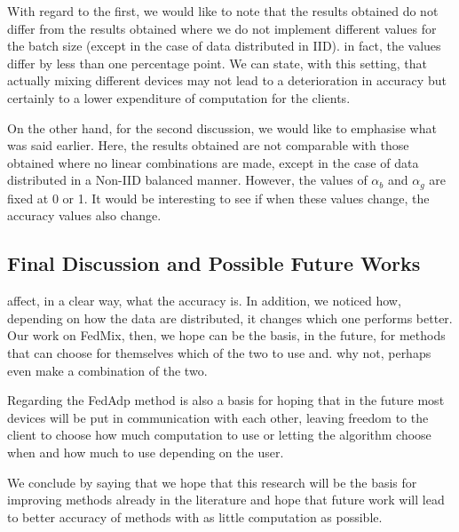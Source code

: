 \documentclass[conference]{IEEEtran}
\begin{document}
With regard to the first, we would like to note that the results obtained do not differ from the results obtained where we do not implement different values for the batch size (except in the case of data distributed in IID). in fact, the values differ by less than one percentage point. We can state, with this setting, that actually mixing different devices may not lead to a deterioration in accuracy but certainly to a lower expenditure of computation for the clients.

On the other hand, for the second discussion, we would like to emphasise what was said earlier. Here, the results obtained are not comparable with those obtained where no linear combinations are made, except in the case of data distributed in a Non-IID balanced manner. However, the values of $\alpha_b$ and $\alpha_g$ are fixed at 0 or 1. It would be interesting to see if when these values change, the accuracy values also change.

\subsection{Final Discussion and Possible Future Works}
affect, in a clear way, what the accuracy is. In addition, we noticed how, depending on how the data are distributed, it changes which one performs better. Our work on FedMix, then, we hope can be the basis, in the future, for methods that can choose for themselves which of the two to use and. why not, perhaps even make a combination of the two.

Regarding the FedAdp method is also a basis for hoping that in the future most devices will be put in communication with each other, leaving freedom to the client to choose how much computation to use or letting the algorithm choose when and how much to use depending on the user. 

We conclude by saying that we hope that this research will be the basis for improving methods already in the literature and hope that future work will lead to better accuracy of methods with as little computation as possible.
\end{document}
